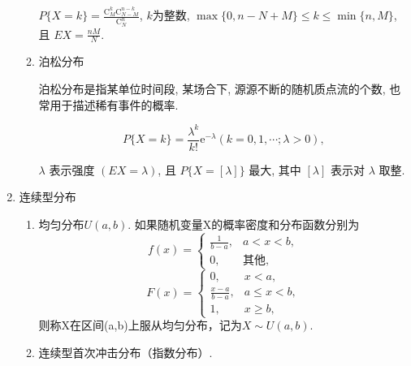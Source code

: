 \begin{enumerate}
\begin{enumerate}
                    $P\{X=k\}=\frac{\mathrm{C}_{M}^{k} \mathrm{C}_{N-M}^{n-k}}{\mathrm{C}_{N}^{n}}$, $k$为整数, $\max \{0, n-N+M\} \leqslant k \leqslant \min \{n, M\}$, 且 $E X=\frac{n M}{N}$.
              \item 泊松分布

                    泊松分布是指某单位时间段, 某场合下, 源源不断的随机质点流的个数, 也常用于描述稀有事件的概率.

                    $$P\{X=k\}=\frac{\lambda^{k}}{k !} \mathrm{e}^{-\lambda}(k=0,1, \cdots ; \lambda>0),$$

                    $\lambda$ 表示强度 $(E X=\lambda)$, 且 $P\{X=[\lambda]\}$ 最大, 其中 $[\lambda]$ 表示对 $\lambda$ 取整.
          \end{enumerate}

    \item 连续型分布
          \begin{enumerate}
              \item 均匀分布$U(a,b)$.
                    如果随机变量X的概率密度和分布函数分别为
                    $$f(x)=\begin{cases}
                            \frac{1}{b-a}, & a<x<b,     \\
                            0,             & \text{其他},
                        \end{cases}$$
                    $$F(x)=\begin{cases}
                            0,               & x<a,            \\
                            \frac{x-a}{b-a}, & a\leqslant x<b, \\
                            1,               & x\geqslant b,
                        \end{cases}$$
                    则称X在区间(a,b)上服从均匀分布，记为$X\sim U(a,b)$.
              \item 连续型首次冲击分布（指数分布）.


\end{enumerate}
\end{enumerate}
